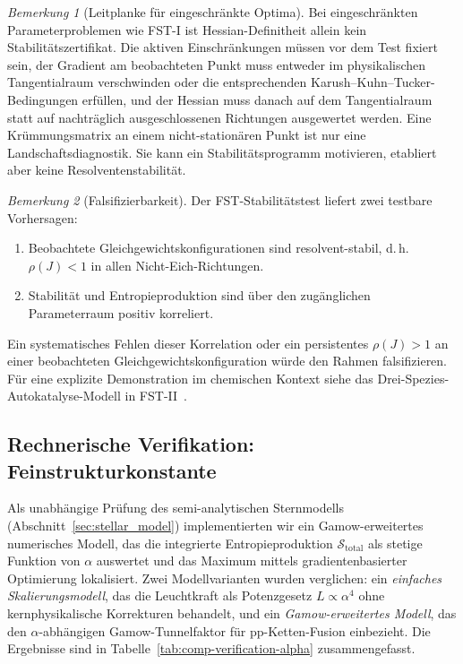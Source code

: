 \documentclass[12pt,a4paper]{article}
\theoremstyle{remark}
\newtheorem{remark}{Bemerkung}
\begin{document}
\begin{remark}[Leitplanke f\"ur eingeschr\"ankte Optima]\label{rem:kkt-guardrail}
Bei eingeschr\"ankten Parameterproblemen wie FST-I ist Hessian-Definitheit
allein kein Stabilit\"atszertifikat. Die aktiven Einschr\"ankungen m\"ussen vor dem
Test fixiert sein, der Gradient am beobachteten Punkt muss entweder im
physikalischen Tangentialraum verschwinden oder die entsprechenden
Karush--Kuhn--Tucker-Bedingungen erf\"ullen, und der Hessian muss danach auf
dem Tangentialraum statt auf nachtr\"aglich ausgeschlossenen Richtungen
ausgewertet werden. Eine Kr\"ummungsmatrix an einem nicht-station\"aren Punkt
ist nur eine Landschaftsdiagnostik. Sie kann ein Stabilit\"atsprogramm
motivieren, etabliert aber keine Resolventenstabilit\"at.
\end{remark}

\begin{remark}[Falsifizierbarkeit]\label{rem:falsifiability-protocol}
Der FST-Stabilit\"atstest liefert zwei testbare Vorhersagen:
\begin{enumerate}[label=(\roman*)]
  \item Beobachtete Gleichgewichtskonfigurationen sind resolvent-stabil,
        d.\,h.\ $\rho(J) < 1$ in allen Nicht-Eich-Richtungen.
  \item Stabilit\"at und Entropieproduktion sind \"uber den zug\"anglichen
        Parameterraum positiv korreliert.
\end{enumerate}
Ein systematisches Fehlen dieser Korrelation oder ein persistentes
$\rho(J) > 1$ an einer beobachteten Gleichgewichtskonfiguration w\"urde
den Rahmen falsifizieren. F\"ur eine explizite Demonstration im
chemischen Kontext siehe das Drei-Spezies-Autokatalyse-Modell in
FST-II~\cite{FSTII}.
\end{remark}

\subsection{Rechnerische Verifikation: Feinstrukturkonstante}
\label{sec:comp-verification-alpha}

Als unabh\"angige Pr\"ufung des semi-analytischen Sternmodells (Abschnitt~\ref{sec:stellar_model}) implementierten wir ein Gamow-erweitertes numerisches Modell, das die integrierte Entropieproduktion $\mathcal{S}_{\text{total}}$ als stetige Funktion von $\alpha$ auswertet und das Maximum mittels gradientenbasierter Optimierung lokalisiert. Zwei Modellvarianten wurden verglichen: ein \emph{einfaches Skalierungsmodell}, das die Leuchtkraft als Potenzgesetz $L \propto \alpha^4$ ohne kernphysikalische Korrekturen behandelt, und ein \emph{Gamow-erweitertes Modell}, das den $\alpha$-abh\"angigen Gamow-Tunnelfaktor f\"ur pp-Ketten-Fusion einbezieht. Die Ergebnisse sind in Tabelle~\ref{tab:comp-verification-alpha} zusammengefasst.
\end{document}
